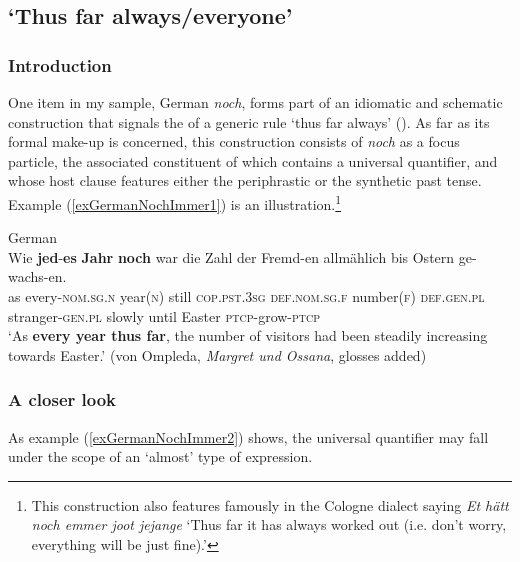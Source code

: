 \subsection{\lq{}Thus far always/everyone\rq}\label{sectionNochImmer}
\subsubsection{Introduction}
One item in my sample, German \textit{noch}, forms part of an idiomatic and schematic construction that signals the  of a generic rule \lq thus far always\rq{} (). As far as its formal make-up is concerned, this construction consists of \textit{noch} as a focus particle, the associated constituent of which contains a universal quantifier, and whose host clause features either the periphrastic 
 or the synthetic past tense. Example (\ref{exGermanNochImmer1}) is an illustration.\footnote{This construction also features famously in the Cologne dialect saying \textit{Et hätt noch emmer joot jejange} \lq Thus far it has always worked out (i.e. don't worry, everything will be just fine).\rq{}}

\begin{exe}
	\ex German\label{exGermanNochImmer1}\\
	\gll Wie \textbf{jed}-\textbf{es} \textbf{Jahr} \textbf{noch} war die Zahl der Fremd-en allmählich bis Ostern ge-wachs-en.\\
	as every-\textsc{nom}.\textsc{sg}.\textsc{n} year(\textsc{n}) still \textsc{cop}.\textsc{pst}.3\textsc{sg} \textsc{def}.\textsc{nom}.\textsc{sg}.\textsc{f} number(\textsc{f}) \textsc{def}.\textsc{gen}.\textsc{pl} stranger-\textsc{gen}.\textsc{pl} slowly until Easter \textsc{ptcp}-grow-\textsc{ptcp}\\
	\glt \lq As \textbf{every year thus far}, the number of visitors had been steadily increasing towards Easter.\rq{ }(von Ompleda, \textit{Margret und Ossana},  glosses added)
\end{exe}

\subsubsection{A closer look} 
As example (\ref{exGermanNochImmer2}) shows, the universal quantifier may fall under the scope of an \lq almost\rq{ }type of expression. 

